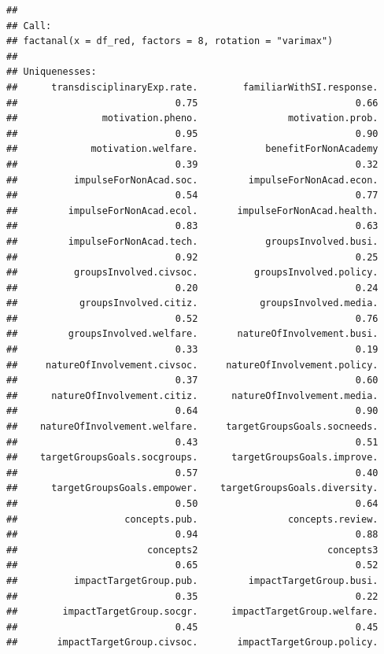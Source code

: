 \documentclass[
]{article}
\begin{document}
\begin{verbatim}
## 
## Call:
## factanal(x = df_red, factors = 8, rotation = "varimax")
## 
## Uniquenesses:
##      transdisciplinaryExp.rate.        familiarWithSI.response. 
##                            0.75                            0.66 
##               motivation.pheno.                motivation.prob. 
##                            0.95                            0.90 
##             motivation.welfare.            benefitForNonAcademy 
##                            0.39                            0.32 
##          impulseForNonAcad.soc.         impulseForNonAcad.econ. 
##                            0.54                            0.77 
##         impulseForNonAcad.ecol.       impulseForNonAcad.health. 
##                            0.83                            0.63 
##         impulseForNonAcad.tech.            groupsInvolved.busi. 
##                            0.92                            0.25 
##          groupsInvolved.civsoc.          groupsInvolved.policy. 
##                            0.20                            0.24 
##           groupsInvolved.citiz.           groupsInvolved.media. 
##                            0.52                            0.76 
##         groupsInvolved.welfare.       natureOfInvolvement.busi. 
##                            0.33                            0.19 
##     natureOfInvolvement.civsoc.     natureOfInvolvement.policy. 
##                            0.37                            0.60 
##      natureOfInvolvement.citiz.      natureOfInvolvement.media. 
##                            0.64                            0.90 
##    natureOfInvolvement.welfare.     targetGroupsGoals.socneeds. 
##                            0.43                            0.51 
##    targetGroupsGoals.socgroups.      targetGroupsGoals.improve. 
##                            0.57                            0.40 
##      targetGroupsGoals.empower.    targetGroupsGoals.diversity. 
##                            0.50                            0.64 
##                   concepts.pub.                concepts.review. 
##                            0.94                            0.88 
##                       concepts2                       concepts3 
##                            0.65                            0.52 
##          impactTargetGroup.pub.         impactTargetGroup.busi. 
##                            0.35                            0.22 
##        impactTargetGroup.socgr.      impactTargetGroup.welfare. 
##                            0.45                            0.45 
##       impactTargetGroup.civsoc.       impactTargetGroup.policy. 

\end{verbatim}
\end{document}

